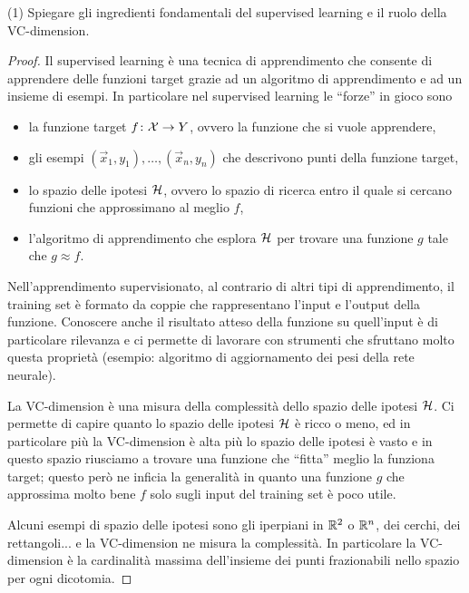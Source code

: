 \documentclass[12pt,a4paper,oneside]{book}
\begin{document}
\begin{exercise}{(1)}
    Spiegare gli ingredienti fondamentali del supervised learning e il
    ruolo della VC-dimension.
    \begin{proof}
        Il supervised learning è una tecnica di apprendimento che
        consente di apprendere delle funzioni target grazie ad un
        algoritmo di apprendimento e ad un insieme di esempi. In
        particolare nel supervised learning le ``forze'' in gioco sono
        \begin{itemize}
            \item la funzione target $\mathord{f}\colon\mathcal{X}\to Y$, ovvero la
              funzione che si vuole apprendere,
            \item gli esempi $(\vec{x}_1, y_1), \ldots, (\vec{x}_n,
              y_n)$ che descrivono punti della funzione target,
            \item lo spazio delle ipotesi $\mathcal{H}$, ovvero lo spazio di
              ricerca entro il quale si cercano funzioni che
              approssimano al meglio $f$,
            \item l'algoritmo di apprendimento che esplora $\mathcal{H}$ per
              trovare una funzione $g$ tale che $g \approx f$.
        \end{itemize}
    
        Nell'apprendimento supervisionato, al contrario di altri tipi
        di apprendimento, il training set è formato da coppie che
        rappresentano l'input e l'output della funzione. Conoscere
        anche il risultato atteso della funzione su quell'input è di
        particolare rilevanza e ci permette di lavorare con strumenti
        che sfruttano molto questa proprietà (esempio: algoritmo di
        aggiornamento dei pesi della rete neurale).
        
        La VC-dimension è una misura della complessità dello spazio
        delle ipotesi $\mathcal{H}$. Ci permette di capire quanto lo spazio
        delle ipotesi $\mathcal{H}$ è ricco o meno, ed in particolare più la
        VC-dimension è alta più lo spazio delle ipotesi è vasto e in
        questo spazio riusciamo a trovare una funzione che ``fitta''
        meglio la funziona target; questo però ne inficia la
        generalità in quanto una funzione $g$ che approssima molto
        bene $f$ solo sugli input del training set è poco utile.
        
        Alcuni esempi di spazio delle ipotesi sono gli iperpiani in
        $\mathbb{R}^2$ o $\mathbb{R}^n$, dei cerchi, dei rettangoli... e la
        VC-dimension ne misura la complessità. In particolare la
        VC-dimension è la cardinalità massima dell'insieme dei punti
        frazionabili nello spazio per ogni dicotomia.
        

\end{proof}
\end{exercise}
\end{document}
